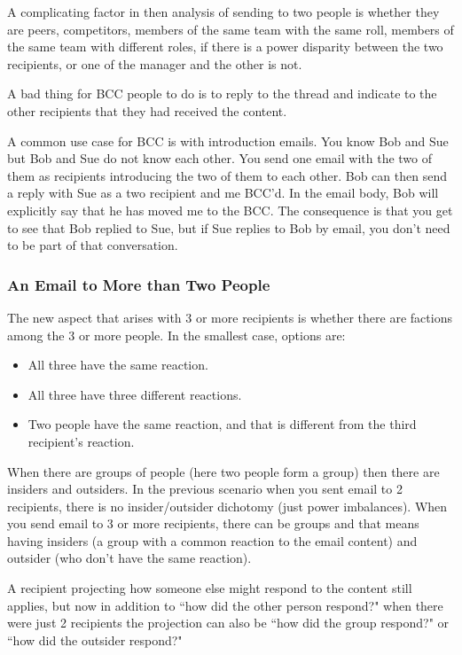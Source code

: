 A complicating factor in then analysis of sending to two people is whether they are peers, competitors, members of the same team with the same roll, members of the same team with different roles, if there is a power disparity between the two recipients,  or one of the manager and the other is not.

A bad thing for BCC people to do is to reply to the thread and indicate to the other recipients that they had received the content.

A common use case for BCC is with introduction emails. You know Bob and Sue but Bob and Sue do not know each other.  You send one email with the two of them as recipients introducing the two of them to each other. Bob can then send a reply with Sue as a two recipient and me BCC'd. In the email body, Bob will explicitly say that he has moved me to the BCC. The consequence is that you get to see that Bob replied to Sue, but if Sue replies to Bob by email, you don't need to be part of that conversation.



\subsubsection*{An Email to More than Two People}
The new aspect that arises with 3 or more recipients is whether there are factions among the 3 or more people. In the smallest case, options are:
\begin{itemize}
\item All three have the same reaction.
\item All three have three different reactions.
\item Two people have the same reaction, and that is different from the third recipient's reaction.
\end{itemize}
When there are groups of people (here two people form a group) then there are insiders and outsiders. In the previous scenario when you sent email to 2 recipients, there is no insider/outsider dichotomy (just power imbalances). When you send email to 3 or more recipients, there can be groups and that means having insiders (a group with a common reaction to the email content) and outsider (who don't have the same reaction).

A recipient projecting how someone else might respond to the content still applies, but now in addition to ``how did the other person respond?" when there were just 2 recipients the projection can also be ``how did the group respond?" or ``how did the outsider respond?"



